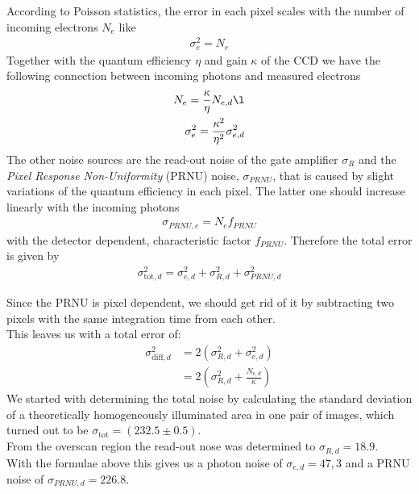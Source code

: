 According to Poisson statistics, the error in each pixel scales with the number of incoming electrons $N_e$ like
\begin{align}
\sigma_e^2 = N_e
\end{align}
Together with the quantum efficiency $\eta$ and gain $\kappa$ of the CCD 
we have the following connection between incoming photons and measured electrons
\begin{align}
N_e = \frac{\kappa}{\eta} N_{e, d} \l\\
\sigma_e^2 = \frac{\kappa^2}{\eta^2} \sigma_{e, d}^2
\end{align}
The other noise sources are the read-out noise of the gate amplifier $\sigma_R$ and the 
\textit{Pixel Response Non-Uniformity} (PRNU) noise, $\sigma_{PRNU}$, 
that is caused by slight variations of the quantum efficiency in each pixel.
The latter one should increase linearly with the incoming photons
\begin{align}
\sigma_{PRNU, e} = N_e f_{PRNU} \label{eq: prnu}
\end{align}
with the detector dependent, characteristic factor $f_{PRNU}$.
Therefore the total error is given by
\begin{align}
\sigma_{\text{tot}, d}^2 = \sigma_{e, d}^2 + \sigma_{R, d}^2 + \sigma_{PRNU, d}^2
\end{align}

Since the PRNU is pixel dependent, we should get rid of it by subtracting two pixels with the same integration time from each other.\\
This leaves us with a total error of:
\begin{align}
\sigma_{\text{diff}, d}^2 &= 2 \left(\sigma_{R, d}^2 + \sigma_{e, d}^2\right)\\
&= 2 \left(\sigma_{R, d}^2 + \frac{N_{e, d}}{\kappa}\right)\label{eqn: linear error}
\end{align}
We started with determining the total noise by calculating the standard deviation of a theoretically homogeneously illuminated area in one pair of images, 
which turned out to be $\sigma_{\text{tot}} = (232.5 \pm 0.5)$. \\

From the overscan region the read-out nose was determined to $\sigma_{R, d} = 18.9$. \\

With the formulae above this gives us a photon noise of $\sigma_{e, d} = 47, 3$ and a PRNU noise of $\sigma_{PRNU, d} = 226.8$. \\

